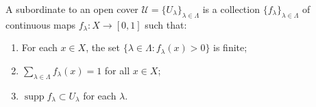 A  subordinate to an open cover $\mathcal{U} = \{U_{\lambda}\}_{\lambda \in \Lambda}$ is a collection $\{f_{\lambda}\}_{\lambda \in \Lambda}$ of continuous maps $f_{\lambda}: X \to [0,1]$ such that:
\begin{enumerate}
\item For each $x \in X$, the set $\{\lambda \in \Lambda : f_{\lambda}(x) > 0\}$ is finite;
\item $\sum_{\lambda \in \Lambda} f_{\lambda}(x) = 1$ for all $x \in X$;
\item $\operatorname{supp} f_{\lambda} \subset U_{\lambda}$ for each $\lambda$.
\end{enumerate}
